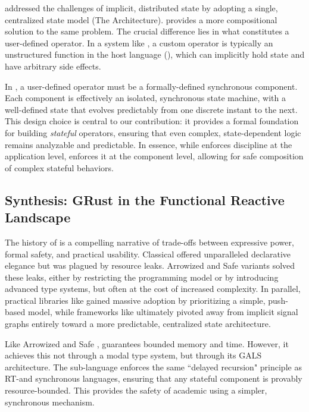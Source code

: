 \Elm addressed the challenges of implicit, distributed state by adopting a single,
centralized state model (The \Elm Architecture). \GRust provides a more compositional
solution to the same problem. The crucial difference lies in what constitutes a user-defined
operator. In a system like \ReactiveX, a custom operator is typically an unstructured function in
the host language (\eg \JavaScript), which can implicitly hold state and have arbitrary side
effects.

In \GRust, a user-defined operator must be a formally-defined synchronous \GRSync component. Each
component is effectively an isolated, synchronous state machine, with a well-defined state that
evolves predictably from one discrete instant to the next. This design choice is central to our
contribution: it provides a formal foundation for building \emph{stateful} operators, ensuring that
even complex, state-dependent logic remains analyzable and predictable. In essence, while
\Elm enforces discipline at the application level, \GRust enforces it at the component
level, allowing for safe composition of complex stateful behaviors.

\subsection{Synthesis: GRust in the Functional Reactive Landscape}
\label{sec:sota:frp:synthesis}

The history of \frp is a compelling narrative of trade-offs between expressive power, formal safety,
and practical usability. Classical \frp offered unparalleled declarative elegance but was plagued by
resource leaks. Arrowized and Safe \frp variants solved these leaks, either by restricting the
programming model or by introducing advanced type systems, but often at the cost of increased
complexity. In parallel, practical libraries like \ReactiveX gained massive adoption by prioritizing
a simple, push-based model, while frameworks like \Elm ultimately pivoted away from implicit
signal graphs entirely toward a more predictable, centralized state architecture.

Like Arrowized and Safe \frp, \GRust guarantees bounded memory and time. However, it achieves this
not through a modal type system, but through its GALS architecture. The \GRSync sub-language enforces the
same ``delayed recursion" principle as RT-\frp and synchronous languages, ensuring that any stateful
component is provably resource-bounded. This provides the safety of academic \frp using a simpler,
synchronous mechanism.

